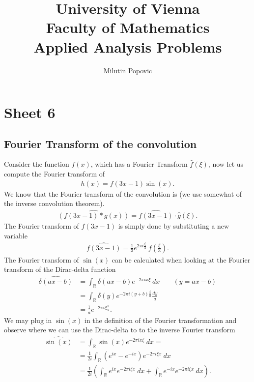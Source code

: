 \documentclass[a4paper]{article}
\title{University of Vienna\\ Faculty of Mathematics\\
\vspace{1cm}Applied Analysis Problems
}
\author{Milutin Popovic}
\begin{document}
\maketitle
\tableofcontents

\section{Sheet 6}
\subsection{Fourier Transform of the convolution}
Consider the function $f(x)$, which has a Fourier Transform $\hat{f}(\xi)$,
now let us compute the Fourier transform of
\begin{align}
    h(x) = f(3x-1) \sin(x) .
\end{align}
We know that the Fourier transform of the convolution is (we use somewhat of
the inverse convolution theorem).
\begin{align}
    \widehat{(f(3x-1)*g(x))} = \widehat{f(3x-1)} \cdot \hat{g}(\xi).
\end{align}
The Fourier transform of $f(3x-1)$ is simply done by substituting a new
variable
\begin{align}
    \widehat{f(3x-1)} = \frac{1}{3}e^{2\pi i\frac{\xi}{3}}\
    f\left(\frac{\xi}{3}\right).
\end{align}
The Fourier transform of $\sin(x)$ can be calculated when looking at the
Fourier transform of the Dirac-delta function
\begin{align}
    \widehat{\delta(ax-b)}
    &=\int_\mathbb{R} \delta(ax-b) e^{-2\pi i x \xi}\ dx
    \;\;\;\;\;\;\; (y = ax-b)\\
    &=\int_\mathbb{R} \delta(y) e^{-2\pi i (y+b)\frac{\xi}{a}}\frac{dy}{a}\\
    &=\frac{1}{a} e^{-2\pi i \xi \frac{b}{a}}.
\end{align}
We may plug in $\sin(x)$ in the definition of the Fourier transformation and
observe where we can use the Dirac-delta to to the inverse Fourier transform
\begin{align}
    \widehat{\sin(x)}
    &=\int_\mathbb{R} \sin(x)e^{-2\pi i x\xi}\ dx=\\
    &=\frac{1}{2i}\int_\mathbb{R} (e^{ix} - e^{-ix})e^{-2\pi i \xi x}\ dx\\
    &=\frac{1}{2i}\left(
        \int_\mathbb{R} e^{ix} e^{-2\pi i \xi x}\ dx+
        \int_\mathbb{R} e^{-ix} e^{-2\pi i \xi x}\ dx
        \right).
\end{align}
\end{document}
